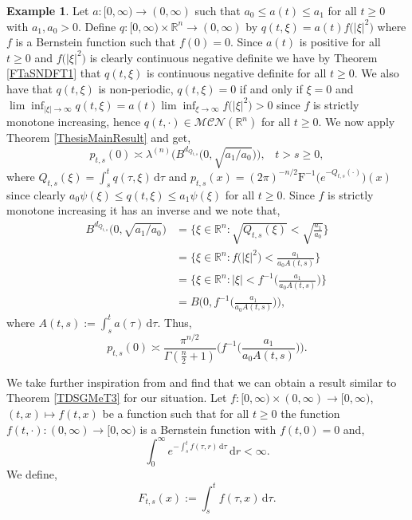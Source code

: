 \documentclass[a4paper, 12pt]{report}
\theoremstyle{remark}
\theoremstyle{definition}
\newtheorem{example}[theorem]{Example}
\begin{document}
\begin{example}
Let $a : [0, \infty) \to (0, \infty)$ such that $a_0 \le a(t) \le a_1$ for all $t \ge 0$ with $a_1, a_0 > 0$.  Define $q : [0, \infty) \times \mathbb{R}^n \to (0, \infty)$ by $q(t, \xi) = a(t)f\big(|\xi|^2\big)$ where $f$ is a Bernstein function such that $f(0) = 0$.  Since $a(t)$ is positive for all $t \ge 0$ and $f\big(|\xi|^2\big)$ is clearly continuous negative definite we have by Theorem \ref{FTaSNDFT1} that $q(t, \xi)$ is continuous negative definite for all $t \ge 0$.  We also have that $q(t, \xi)$ is non-periodic, $q(t, \xi) = 0$ if and only if $\xi = 0$ and $\lim\inf_{|\xi| \to \infty}q(t, \xi) = a(t)\lim\inf_{\xi \to \infty}f\big(|\xi|^2\big) > 0$ since $f$ is strictly monotone increasing, hence $q(t, \cdot) \in \mathcal{MCN}(\mathbb{R}^n)$ for all $t \ge 0$.  We now apply Theorem \ref{ThesisMainResult} and get,
$$
p_{t, s}(0) \asymp \lambda^{(n)}\Big(B^{d_{Q_{t, s}}}\big(0, \sqrt{a_1/a_0}\big)\Big), \,\,\,\,\, t > s \ge 0,
$$
where $Q_{t, s}(\xi) = \int_s^tq(\tau, \xi)\,\mathrm{d}\tau$ and $p_{t, s}(x) = (2\pi)^{-n/2}\mathrm{F}^{-1}\big(e^{-Q_{t, s}(\cdot)}\big)(x)$ since clearly $a_0\psi(\xi) \le q(t, \xi) \le a_1\psi(\xi)$ for all $t \ge 0$.  Since $f$ is strictly monotone increasing it has an inverse and we note that,
$$
\begin{aligned}
B^{d_{Q_{t, s}}}\big(0, \sqrt{a_1/a_0}\big) & = \bigg\{\xi \in \mathbb{R}^n : \sqrt{Q_{t, s}(\xi)} < \sqrt{\frac{a_1}{a_0}}\bigg\}\\
& = \bigg\{\xi \in \mathbb{R}^n : f\big(|\xi|^2\big) < \frac{a_1}{a_0A(t, s)}\bigg\}\\
& = \bigg\{\xi \in \mathbb{R}^n : |\xi| < f^{-1}\Big(\frac{a_1}{a_0A(t, s)}\Big)\bigg\}\\
& = B\bigg(0, f^{-1}\Big(\frac{a_1}{a_0A(t, s)}\Big)\bigg),
\end{aligned}
$$
where $A(t, s) := \int_s^ta(\tau)\,\mathrm{d}\tau$.  Thus,
$$
p_{t, s}(0) \asymp \frac{\pi^{n/2}}{\Gamma(\frac{n}{2} + 1)}\bigg(f^{-1}\Big(\frac{a_1}{a_0A(t, s)}\Big)\bigg).
$$
\end{example}

We take further inspiration from \cite{Paper} and find that we can obtain a result similar to Theorem \ref{TDSGMeT3} for our situation.  Let $f : [0, \infty) \times (0, \infty) \to [0, \infty)$, $(t, x) \mapsto f(t, x)$ be a function such that for all $t \ge 0$ the function $f(t, \cdot) : (0, \infty) \to [0, \infty)$ is a Bernstein function with $f(t, 0) = 0$ and,
$$
\int_0^\infty e^{-\int_s^t f(\tau, r)\,\mathrm{d}\tau}\,\mathrm{d}r < \infty.
$$
We define,
\begin{equation}
F_{t, s}(x) := \int_s^t f(\tau, x)\,\mathrm{d}\tau\label{BF}.
\end{equation}
\end{document}
